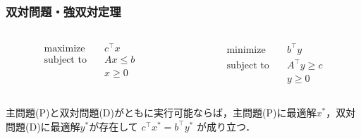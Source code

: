 \documentclass[14pt,aspectratio=169,xcolor=dvipsnames,table,onlytextwidth,dvipdfmx]{beamer}
\begin{document}
\begin{frame}
    \frametitle{双対問題・強双対定理}
    \begin{columns}[T]
    \begin{column}{.45\textwidth}
    \begin{primal}
        \setlength{\abovedisplayskip}{0pt}
        \begin{alignat*}{2}
            \text{maximize} & \quad  c^\top x \\
            \text{subject to} & \quad A x \leq b  \\
            & \quad x \geq 0 
        \end{alignat*}
    \end{primal}
    \end{column}
    \begin{column}{.45\textwidth}
    \begin{dual}
        \setlength{\abovedisplayskip}{0pt}
        \begin{alignat*}{2}
            \text{minimize} & \quad  b^\top y \\
            \text{subject to} & \quad A^\top y \geq c  \\
            & \quad y \geq 0 
        \end{alignat*}
    \end{dual}
    \end{column}
    \end{columns}
    
    \vfill
    \pause
    \begin{theorem}[強双対定理]
        主問題(P)と双対問題(D)がともに実行可能ならば，主問題(P)に最適解$x^*$，双対問題(D)に最適解$y^*$が存在して
        $
            c^\top x^* = b^\top y^*
            $
            が成り立つ．
    \end{theorem}
\end{frame}
\end{document}
